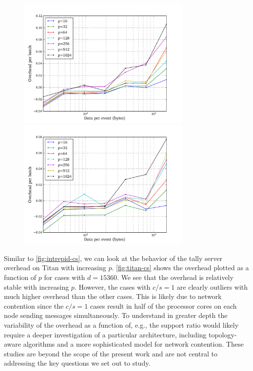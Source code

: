 \begin{figure}[!tbh]
{  }
  \begin{floatrow}
     {\includegraphics[width=3.4in]{figures/ch6/results_titan_r7}}
     {\includegraphics[width=3.4in]{figures/ch6/results_titan_r15}}
  \end{floatrow}
\end{figure}

Similar to \autoref{fig:intrepid-cs}, we can look at the behavior of the tally
server overhead on Titan with increasing $p$. \autoref{fig:titan-cs} shows the
overhead plotted as a function of $p$ for cases with $d = 15360$. We see that
the overhead is relatively stable with increasing $p$. However, the cases with
$c/s = 1$ are clearly outliers with much higher overhead than the other
cases. This is likely due to network contention since the $c/s = 1$ cases result
in half of the processor cores on each node sending messages simultaneously. To
understand in greater depth the variability of the overhead as a function of,
e.g., the support ratio would likely require a deeper investigation of a
particular architecture, including topology-aware algorithms and a more
sophisticated model for network contention. These studies are beyond the scope
of the present work and are not central to addressing the key questions we set
out to study.

